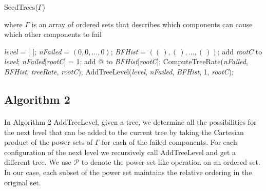 \documentclass[12pt]{article}
\newcommand{\varName}[1]{\textrm{\it#1}}
\begin{document}
\begin{algorithm}
\caption{SeedTrees($\Gamma$)}
\label{alg:Seedtrees}
where $\Gamma$ is an array of ordered sets that describes which components can cause which other components to fail \\
\begin{algorithmic}[1]
\FOR{\varName{rootC} $\in$ \varName{compSet}}
  \STATE \varName{level} = [ ]; 
  \STATE \varName{nFailed} = $(0, 0, \ldots, 0)$; 
  \STATE \varName{BFHist} = $ ((\,), (\,), \ldots, (\,)) $; 
  \STATE add \varName{rootC} to \varName{level};
  \STATE \varName{nFailed}[\varName{rootC}] = 1;
  \STATE add @ to \varName{BFHist}[\varName{rootC}]; 
  \IF{Empty($\Gamma_{\varName{rootC}}$)}
    \STATE ComputeTreeRate(\varName{nFailed}, \varName{BFHist}, \varName{treeRate}, \varName{rootC});
  \ELSE
    \STATE AddTreeLevel(\varName{level}, \varName{nFailed}, \varName{BFHist}, 1, \varName{rootC});
  \ENDIF
\ENDFOR
\end{algorithmic}
\end{algorithm}

\subsection{Algorithm 2}

\paragraph{} In Algorithm 2 AddTreeLevel, given a tree, we determine all the possibilities for the next level that can be added to the current tree by taking the Cartesian product of the power sets of $\Gamma$ for each of the failed components. For each configuration of the next level we recursively call AddTreeLevel and get a different tree. We use $\mathcal{P}$ to denote the power set-like operation on an ordered set. In our case, each subset of the power set maintains the relative ordering in the original set.
\end{document}
